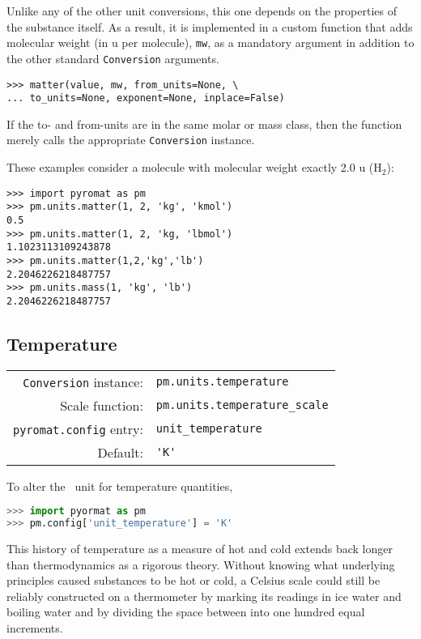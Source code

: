 Unlike any of the other unit conversions, this one depends on the properties of the substance itself.  As a result, it is implemented in a custom function that adds molecular weight (in u per molecule), \verb|mw|, as a mandatory argument in addition to the other standard \verb|Conversion| arguments.

\begin{lstlisting}
>>> matter(value, mw, from_units=None, \
... to_units=None, exponent=None, inplace=False)
\end{lstlisting}

If the to- and from-units are in the same molar or mass class, then the function merely calls the appropriate \verb|Conversion| instance.

These examples consider a molecule with molecular weight exactly 2.0 u (H$_2$):
\begin{lstlisting}
>>> import pyromat as pm
>>> pm.units.matter(1, 2, 'kg', 'kmol')
0.5
>>> pm.units.matter(1, 2, 'kg, 'lbmol')
1.1023113109243878
>>> pm.units.matter(1,2,'kg','lb')
2.2046226218487757
>>> pm.units.mass(1, 'kg', 'lb')
2.2046226218487757
\end{lstlisting}

%
%

\subsection{Temperature}\label{sec:units:temperature}

\begin{tabular}{rl}
\hline
\verb|Conversion| instance: & \verb|pm.units.temperature|\\
Scale function: & \verb|pm.units.temperature_scale|\\
\verb|pyromat.config| entry: & \verb|unit_temperature|\\
Default: & \verb|'K'|\\
\hline
\end{tabular}
\vspace{1em}

To alter the \PM\ unit for temperature quantities,
\begin{lstlisting}[language=Python]
>>> import pyormat as pm
>>> pm.config['unit_temperature'] = 'K'
\end{lstlisting}

This history of temperature as a measure of hot and cold extends back longer than thermodynamics as a rigorous theory.  Without knowing what underlying principles caused substances to be hot or cold, a Celsius scale could still be reliably constructed on a thermometer by marking its readings in ice water and boiling water and by dividing the space between into one hundred equal increments. 

